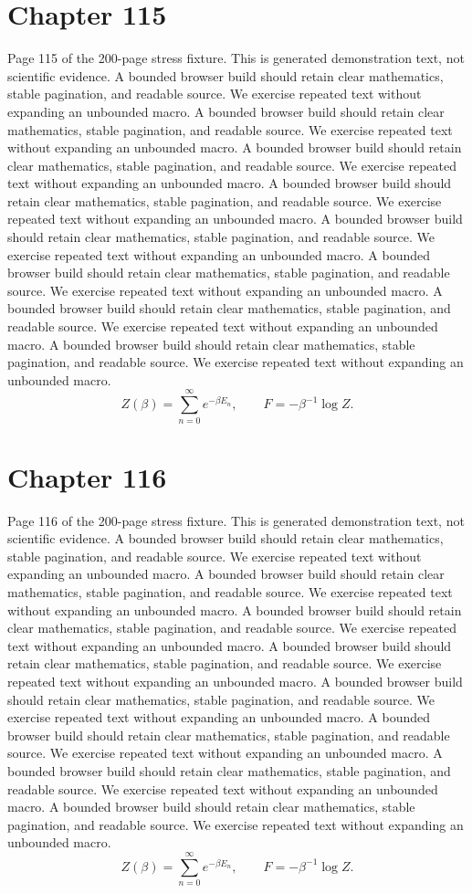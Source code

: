 \documentclass[11pt]{article}
\begin{document}
\section*{Chapter 115}
Page 115 of the 200-page stress fixture. This is generated demonstration text, not scientific evidence.
A bounded browser build should retain clear mathematics, stable pagination, and readable source. We exercise repeated text without expanding an unbounded macro.
A bounded browser build should retain clear mathematics, stable pagination, and readable source. We exercise repeated text without expanding an unbounded macro.
A bounded browser build should retain clear mathematics, stable pagination, and readable source. We exercise repeated text without expanding an unbounded macro.
A bounded browser build should retain clear mathematics, stable pagination, and readable source. We exercise repeated text without expanding an unbounded macro.
A bounded browser build should retain clear mathematics, stable pagination, and readable source. We exercise repeated text without expanding an unbounded macro.
A bounded browser build should retain clear mathematics, stable pagination, and readable source. We exercise repeated text without expanding an unbounded macro.
A bounded browser build should retain clear mathematics, stable pagination, and readable source. We exercise repeated text without expanding an unbounded macro.
A bounded browser build should retain clear mathematics, stable pagination, and readable source. We exercise repeated text without expanding an unbounded macro.
\[Z(\beta)=\sum_{n=0}^{\infty}e^{-\beta E_n},\qquad F=-\beta^{-1}\log Z.\]
\newpage
\section*{Chapter 116}
Page 116 of the 200-page stress fixture. This is generated demonstration text, not scientific evidence.
A bounded browser build should retain clear mathematics, stable pagination, and readable source. We exercise repeated text without expanding an unbounded macro.
A bounded browser build should retain clear mathematics, stable pagination, and readable source. We exercise repeated text without expanding an unbounded macro.
A bounded browser build should retain clear mathematics, stable pagination, and readable source. We exercise repeated text without expanding an unbounded macro.
A bounded browser build should retain clear mathematics, stable pagination, and readable source. We exercise repeated text without expanding an unbounded macro.
A bounded browser build should retain clear mathematics, stable pagination, and readable source. We exercise repeated text without expanding an unbounded macro.
A bounded browser build should retain clear mathematics, stable pagination, and readable source. We exercise repeated text without expanding an unbounded macro.
A bounded browser build should retain clear mathematics, stable pagination, and readable source. We exercise repeated text without expanding an unbounded macro.
A bounded browser build should retain clear mathematics, stable pagination, and readable source. We exercise repeated text without expanding an unbounded macro.
\[Z(\beta)=\sum_{n=0}^{\infty}e^{-\beta E_n},\qquad F=-\beta^{-1}\log Z.\]
\newpage
\end{document}
